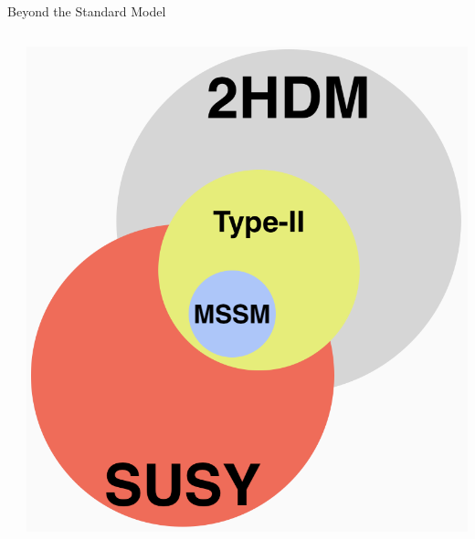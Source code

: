 \documentclass[aspectratio=169,xcolor=table]{beamer}
\def\boxit#1{%
  \smash{\color{red}\fboxrule=1pt\relax\fboxsep=2pt\relax%
  \llap{\rlap{\fbox{\vphantom{0}\makebox[#1]{}}}~}}\ignorespaces
}
\begin{document}
\begin{frame}[t]{Beyond the Standard Model}
\begin{columns}[t]
\begin{itemize}
        \end{itemize}
      \begin{centering}
      \includegraphics[height=.4\textheight,keepaspectratio=true]{SUSY_Bubble.png}
      \end{centering}
      \centering
        \begin{table}[!thp]
          \centering
      \end{table}
      \end{columns}
    \end{frame}
\end{document}
